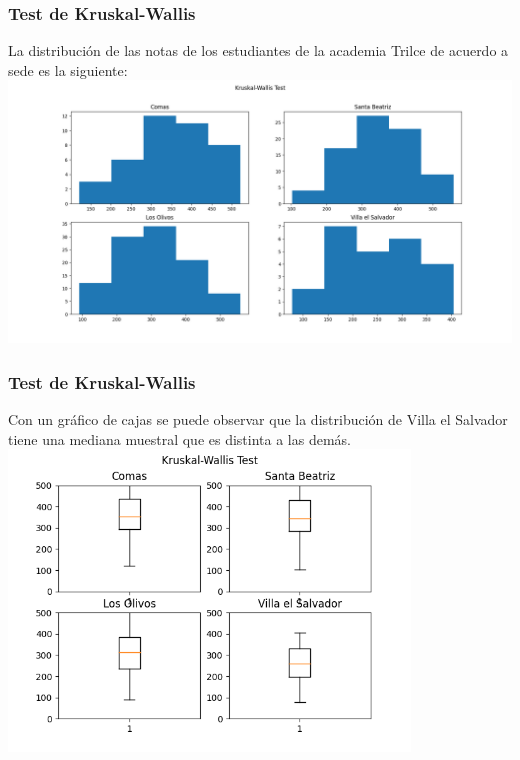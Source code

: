 \begin{frame}
    \frametitle{Test de Kruskal-Wallis}
    La distribución de las notas de los estudiantes de la academia Trilce
    de acuerdo a sede es la siguiente: 
    \includegraphics[width=1\textwidth]{cap/images/kruskal.png}
\end{frame}

\begin{frame}
    \frametitle{Test de Kruskal-Wallis}
    Con un gráfico de cajas se puede observar que la distribución de 
    Villa el Salvador tiene una mediana muestral que es distinta a las demás. 
    \centering
    \includegraphics[width=0.8\textwidth]{cap/images/kruskal_boxplot.png}
\end{frame}

